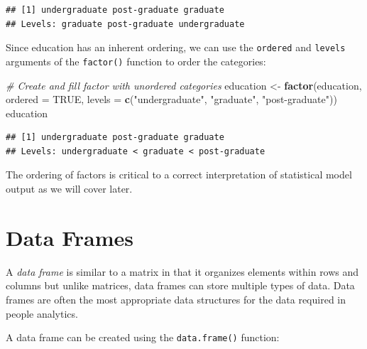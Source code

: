 \documentclass[]{book}
\newenvironment{Shaded}{\begin{snugshade}}{\end{snugshade}}
\newcommand{\CommentTok}[1]{\textcolor[rgb]{0.56,0.35,0.01}{\textit{#1}}}
\newcommand{\DataTypeTok}[1]{\textcolor[rgb]{0.13,0.29,0.53}{#1}}
\newcommand{\KeywordTok}[1]{\textcolor[rgb]{0.13,0.29,0.53}{\textbf{#1}}}
\newcommand{\NormalTok}[1]{#1}
\newcommand{\OtherTok}[1]{\textcolor[rgb]{0.56,0.35,0.01}{#1}}
\newcommand{\StringTok}[1]{\textcolor[rgb]{0.31,0.60,0.02}{#1}}
\begin{document}
\begin{verbatim}
## [1] undergraduate post-graduate graduate     
## Levels: graduate post-graduate undergraduate
\end{verbatim}

Since education has an inherent ordering, we can use the \texttt{ordered} and \texttt{levels} arguments of the \texttt{factor()} function to order the categories:

\begin{Shaded}
\begin{Highlighting}[]
\CommentTok{# Create and fill factor with unordered categories}
\NormalTok{education <-}\StringTok{ }\KeywordTok{factor}\NormalTok{(education, }\DataTypeTok{ordered =} \OtherTok{TRUE}\NormalTok{, }\DataTypeTok{levels =} \KeywordTok{c}\NormalTok{(}\StringTok{"undergraduate"}\NormalTok{, }\StringTok{"graduate"}\NormalTok{, }\StringTok{"post-graduate"}\NormalTok{))}
\NormalTok{education}
\end{Highlighting}
\end{Shaded}

\begin{verbatim}
## [1] undergraduate post-graduate graduate     
## Levels: undergraduate < graduate < post-graduate
\end{verbatim}

The ordering of factors is critical to a correct interpretation of statistical model output as we will cover later.

\hypertarget{data-frames}{%
\section{Data Frames}\label{data-frames}}

A \emph{data frame} is similar to a matrix in that it organizes elements within rows and columns but unlike matrices, data frames can store multiple types of data. Data frames are often the most appropriate data structures for the data required in people analytics.

A data frame can be created using the \texttt{data.frame()} function:
\end{document}
